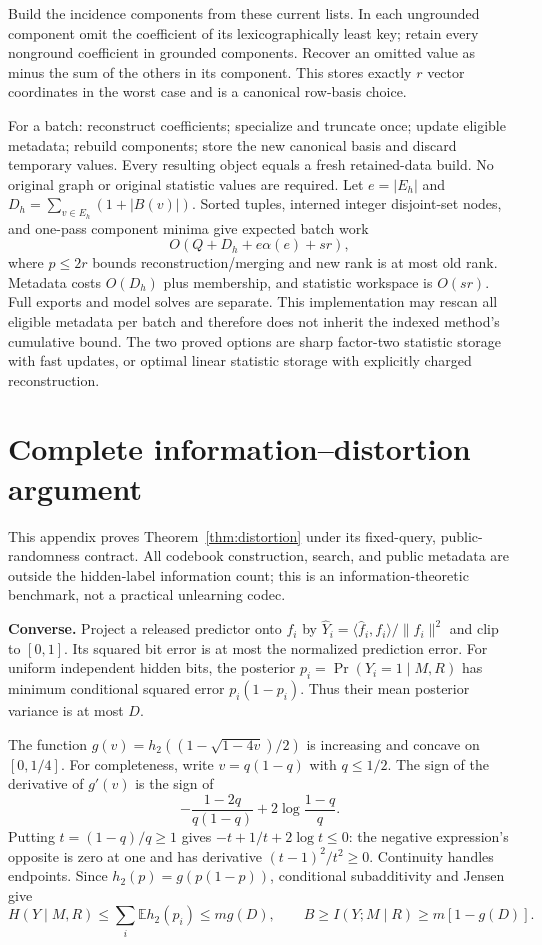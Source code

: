 \documentclass[11pt,a4paper]{article}
\theoremstyle{definition}\newtheorem{definition}[theorem]{Definition}
\begin{document}
Build the incidence components from these current lists. In each ungrounded component omit the coefficient of its lexicographically least key; retain every nonground coefficient in grounded components. Recover an omitted value as minus the sum of the others in its component. This stores exactly $r$ vector coordinates in the worst case and is a canonical row-basis choice.

For a batch: reconstruct coefficients; specialize and truncate once; update eligible metadata; rebuild components; store the new canonical basis and discard temporary values. Every resulting object equals a fresh retained-data build. No original graph or original statistic values are required. Let $e=|E_h|$ and $D_h=\sum_{v\in E_h}(1+|B(v)|)$. Sorted tuples, interned integer disjoint-set nodes, and one-pass component minima give expected batch work
\[
 O(Q+D_h+e\alpha(e)+sr),
\]
where $p\le2r$ bounds reconstruction/merging and new rank is at most old rank. Metadata costs $O(D_h)$ plus membership, and statistic workspace is $O(sr)$. Full exports and model solves are separate. This implementation may rescan all eligible metadata per batch and therefore does not inherit the indexed method's cumulative bound. The two proved options are sharp factor-two statistic storage with fast updates, or optimal linear statistic storage with explicitly charged reconstruction.

\section{Complete information--distortion argument}\label{app:coding}
This appendix proves Theorem~\ref{thm:distortion} under its fixed-query, public-randomness contract. All codebook construction, search, and public metadata are outside the hidden-label information count; this is an information-theoretic benchmark, not a practical unlearning codec.

\textbf{Converse.} Project a released predictor onto $f_i$ by
$\widehat Y_i=\langle\widehat f_i,f_i\rangle/\|f_i\|^2$ and clip to $[0,1]$. Its squared bit error is at most the normalized prediction error. For uniform independent hidden bits, the posterior $p_i=\Pr(Y_i=1\mid M,R)$ has minimum conditional squared error $p_i(1-p_i)$. Thus their mean posterior variance is at most $D$.

The function $g(v)=h_2((1-\sqrt{1-4v})/2)$ is increasing and concave on $[0,1/4]$. For completeness, write $v=q(1-q)$ with $q\le1/2$. The sign of the derivative of $g'(v)$ is the sign of
\[
 -\frac{1-2q}{q(1-q)}+2\log\frac{1-q}{q}.
\]
Putting $t=(1-q)/q\ge1$ gives $-t+1/t+2\log t\le0$: the negative expression's opposite is zero at one and has derivative $(t-1)^2/t^2\ge0$. Continuity handles endpoints. Since $h_2(p)=g(p(1-p))$, conditional subadditivity and Jensen give
\[
 H(Y\mid M,R)\le\sum_i\mathbb E h_2(p_i)\le mg(D),\qquad
 B\ge I(Y;M\mid R)\ge m[1-g(D)].
\]
\end{document}
